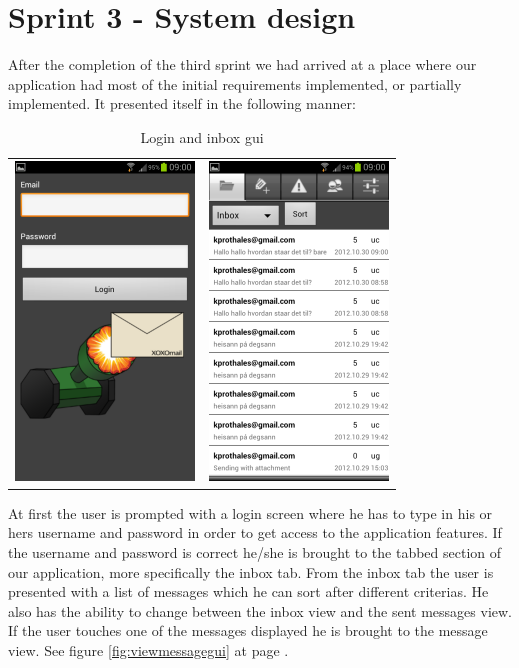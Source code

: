 \section{Sprint 3 - System design}
After the completion of the third sprint we had arrived at a place where our application had most of the initial requirements implemented, or partially implemented. It presented itself in the following manner:
\newline
\newline
\begin{table}[h!]
\begin{center}
\begin{tabular}{cc}
\includegraphics{logingui} & \includegraphics{inbox}
\end{tabular}
\end{center}
\caption{Login and inbox gui} \label{tab:logininboxgui}
\end{table}

At first the user is prompted with a login screen where he has to type in his or hers username and password in order to get access to the application features. If the username and password is correct he/she is brought to the tabbed section of our application, more specifically the inbox tab. From the inbox tab the user is presented with a list of messages which he can sort after different criterias. He also has the ability to change between the inbox view and the sent messages view. If the user touches one of the messages displayed he is brought to the message view. See figure \ref{fig:viewmessagegui} at page \pageref{fig:viewmessagegui}.
\newline

